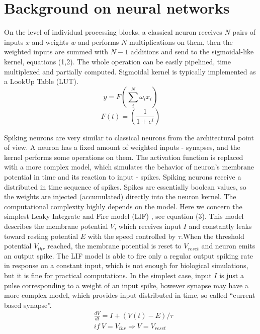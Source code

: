 \documentclass[conference, compsoc]{IEEEtran}
\begin{document}
\section{Background on neural networks}
On the level of individual processing blocks, a classical neuron receives $ N $ pairs of inputs $ x $ and weights $ w $ and performs $ N $ multiplications on them, then the weighted inputs are summed with $ N-1 $ additions and send to the sigmoidal-like kernel, equations (1,2). The whole operation can be easily pipelined, time multiplexed and partially computed. Sigmoidal kernel is typically implemented as a LookUp Table (LUT).
\begin{equation} \label{eq:1}
y=F(\sum_{i}^{N}\omega_{i}x_{i})
\end{equation}
\begin{equation} \label{eq:2}
F(t)=(\frac{1}{1+e^{i}})
\end{equation}

Spiking neurons are very similar to classical neurons from the architectural point of view. A neuron has a fixed amount of weighted inputs - synapses, and the kernel performs some operations on them. The activation function is replaced with a more complex model, which simulates the behavior of neuron’s membrane potential in time and its reaction to input - spikes. Spiking neurons receive a distributed in time sequence of spikes. Spikes are essentially boolean values, so the weights are injected (accumulated) directly into the neuron kernel. The computational complexity highly depends on the model. Here we concern the simplest Leaky Integrate and Fire model (LIF) \cite{Gerstner:SNN_models}, see equation (3). This model describes the membrane potential $ V $, which receives input $ I $ and constantly leaks toward resting potential $ E $ with the speed controlled by $ \tau $.When the threshold potential $ V_{thr} $ reached, the membrane potential is reset to $ V_{reset} $ and neuron emits an output spike. The LIF model is able to fire only a regular output spiking rate in response on a constant input, which is not enough for biological simulations, but it is fine for practical computations. In the simplest case, input $ I $ is just a pulse corresponding to a weight of an input spike, however synapse may have a more complex model, which provides input distributed in time, so called “current based synapse”.
\begin{equation} \label{eq:3}
\begin{split}
&\frac{dV}{dt}=I+(V(t)-E)/\tau\\
& if~V=V_{thr}\Rightarrow V=V_{reset}
\end{split}
\end{equation}
\end{document}
